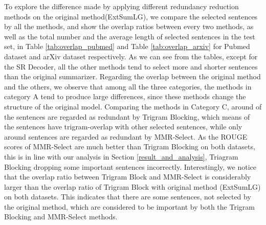 \documentclass[11pt,a4paper]{article}
\begin{document}
\begin{table*}[]
    \centering
    \caption{Micro overlap ratio (\%) between the selections of different methods and the total number and the average length of selected sentences in the test set of arXiv.}
    \label{tab:overlap_arxiv}
\end{table*}
To explore the difference made by applying different redundancy reduction methods on the original method(ExtSumLG), we compare the selected sentences by all the methods, and show the overlap ratios between every two methods, as well as the total number and the average length of selected sentences in the test set, in Table \ref{tab:overlap_pubmed} and Table \ref{tab:overlap_arxiv} for Pubmed dataset and arXiv dataset respectively. As we can see from the tables, except for the SR Decoder, all the other methods tend to select more and shorter sentences than the original summarizer. Regarding the overlap between the original method and the others, we observe that among all the three categories, the methods in category A tend to produce large differences, since these methods change the structure of the original model. Comparing the methods in Category C, around  of the sentences are regarded as redundant by Trigram Blocking, which means  of the sentences have trigram-overlap with other selected sentences, while only around  sentences are regarded as redundant by MMR-Select. As the ROUGE scores of MMR-Select are much better than Trigram Blocking on both datasets, this is in line with our analysis in Section \ref{result_and_analysis}, Triagram Blocking dropping some important sentences incorrectly. Interestingly,
we notice that the overlap ratio between Trigram Block and MMR-Select is considerably larger than the overlap ratio of Trigram Block with original method (ExtSumLG) on both datasets. This indicates that there are some sentences, not selected by the original method, which are considered to be important by both the Trigram Blocking and MMR-Select methods.
\end{document}
